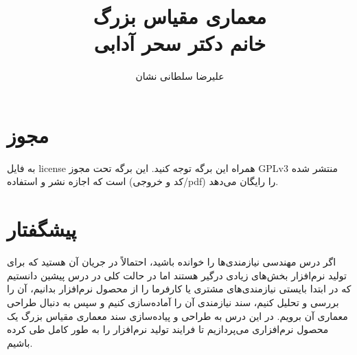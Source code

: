 \documentclass[a4paper]{article}
\title{معماری مقیاس بزرگ \\ خانم دکتر سحر آدابی}
\author{علیرضا سلطانی نشان}
\begin{document}
\maketitle
\tableofcontents

\section*{مجوز}

به فایل license همراه این برگه توجه کنید. این برگه تحت مجوز GPLv3 منتشر شده است
که اجازه نشر و استفاده (کد و خروجی/pdf) را رایگان می‌دهد.

\section{پیشگفتار}

اگر درس مهندسی نیازمندی‌ها را خوانده باشید، احتمالاً در جریان آن هستید که برای
تولید نرم‌افزار بخش‌های زیادی درگیر هستند اما در حالت کلی در درس پیشین دانستیم
که در ابتدا بایستی نیازمندی‌های مشتری یا کارفرما را از محصول نرم‌افزار بدانیم،
آن را بررسی و تحلیل کنیم، سند نیازمندی آن را آماده‌سازی کنیم و سپس به دنبال
طراحی معماری آن برویم. در این درس به طراحی و پیاده‌سازی سند معماری مقیاس بزرگ یک
محصول نرم‌افزاری می‌پردازیم تا فرایند تولید نرم‌افزار را به طور کامل طی کرده
باشیم.








\newpage


\end{document}

